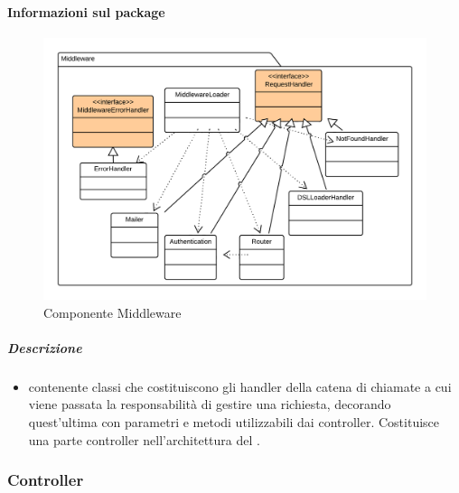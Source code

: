   \paragraph{Informazioni sul package} 
    \begin{figure}[H] 
      \begin{center} 
        \includegraphics[width=\textwidth]{uml/package/Back-end::Lib::Controller::Middleware.png}  
        \caption{Componente Middleware}
      \end{center}  
    \end{figure} 
  \subparagraph{Descrizione} 
    \begin{itemize}
    \item[]  contenente classi che costituiscono gli handler della catena di chiamate a cui viene
passata la responsabilità di gestire una richiesta, decorando quest’ultima con parametri e
metodi utilizzabili dai controller. Costituisce una parte controller nell’architettura 
del  .

    \end{itemize} 
  \subsubsection{Controller}
